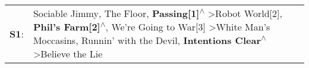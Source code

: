 \begin{supertabular}{p{0.03\textwidth}p{0.92\textwidth}}
 \textbf{S1}:  &  Sociable Jimmy\textsuperscript{}, \enspace The Floor\textsuperscript{}, \enspace \textbf{Passing[1]\textsuperscript{$\wedge$}} \textgreater \enspace Robot World[2]\textsuperscript{}, \enspace \textbf{Phil's Farm[2]\textsuperscript{$\wedge$}}, \enspace We're Going to War[3]\textsuperscript{} \textgreater \enspace White Man's Moccasins\textsuperscript{}, \enspace Runnin' with the Devil\textsuperscript{}, \enspace \textbf{Intentions Clear\textsuperscript{$\wedge$}} \textgreater \enspace Believe the Lie\textsuperscript{}  \enspace  \\
\end{supertabular}
